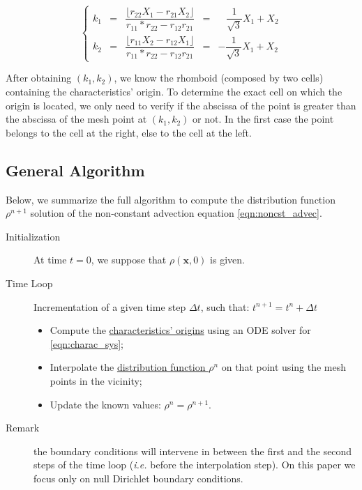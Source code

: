 \documentclass[proc]{edpsmath}
\begin{document}
\begin{equation}
	\label{eqn:k1k2}
	\left\lbrace
	\begin{array}{lclcl}
	k_1 &=&  \dfrac{\lfloor r_{22} X_1 - r_{21} X_2 \rfloor}{r_{11}*r_{22} - r_{12} r_{21}} & = &  \;\;\;\dfrac{1}{\sqrt{3}} X_1 + X_2\\[0.3cm]
	k_2 &=&  \dfrac{\lfloor r_{11} X_2 - r_{12} X_1 \rfloor}{r_{11}*r_{22} - r_{12} r_{21}} & = &  -\dfrac{1}{\sqrt{3}} X_1 + X_2
	\end{array}\right.
\end{equation}

After obtaining $(k_1, k_2)$, we know the rhomboid (composed by two cells) containing the characteristics' origin. To determine the exact cell on which the origin is located, we only need to verify if the abscissa of the point is greater than the abscissa of the mesh point at $(k_1, k_2)$ or not. In the first case the point belongs to the cell at the right, else to the cell at the left.


\subsection{General Algorithm}

Below, we summarize the full algorithm to compute the distribution function $\rho^{n+1}$ solution of the non-constant advection equation \eqref{eqn:noncst_advec}.

\begin{description}
	\item[Initialization] At time $t=0$, we suppose that $\rho(\mathbf{x}, 0)$ is given.
	\item[Time Loop] Incrementation of a given time step $\Delta t$, such that: $t^{n+1} = t^n + \Delta t$
		\begin{itemize}
		\item Compute the \underline{characteristics' origins} using an ODE solver for \eqref{eqn:charac_sys};
		\item Interpolate the \underline{distribution function $\rho^n$} on that point using the mesh points in the vicinity;
		\item Update the known values: $\rho^n = \rho^{n+1}$.
		\end{itemize}
	\item[Remark] the boundary conditions will intervene in between the first and the second steps of the time loop (\emph{i.e.} before the interpolation step). On this paper we focus only on null Dirichlet boundary conditions.
\end{description}
\end{document}
